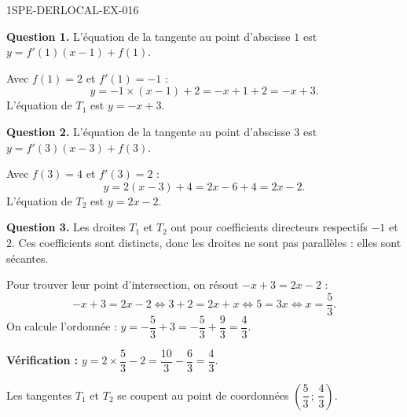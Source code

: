 \begin{corrige}{1SPE-DERLOCAL-EX-016}

\textbf{Question 1.} L'équation de la tangente au point d'abscisse $1$ est $y = f'(1)(x - 1) + f(1)$.

Avec $f(1) = 2$ et $f'(1) = -1$ :
\[
y = -1 \times (x - 1) + 2 = -x + 1 + 2 = -x + 3.
\]
L'équation de $T_1$ est $\boxed{y = -x + 3}$.

\textbf{Question 2.} L'équation de la tangente au point d'abscisse $3$ est $y = f'(3)(x - 3) + f(3)$.

Avec $f(3) = 4$ et $f'(3) = 2$ :
\[
y = 2(x - 3) + 4 = 2x - 6 + 4 = 2x - 2.
\]
L'équation de $T_2$ est $\boxed{y = 2x - 2}$.

\textbf{Question 3.} Les droites $T_1$ et $T_2$ ont pour coefficients directeurs respectifs $-1$ et $2$. Ces coefficients sont distincts, donc les droites ne sont pas parallèles : elles sont sécantes.

Pour trouver leur point d'intersection, on résout $-x + 3 = 2x - 2$ :
\[
-x + 3 = 2x - 2 \iff 3 + 2 = 2x + x \iff 5 = 3x \iff x = \dfrac{5}{3}.
\]
On calcule l'ordonnée : $y = -\dfrac{5}{3} + 3 = -\dfrac{5}{3} + \dfrac{9}{3} = \dfrac{4}{3}$.

\textbf{Vérification :} $y = 2 \times \dfrac{5}{3} - 2 = \dfrac{10}{3} - \dfrac{6}{3} = \dfrac{4}{3}$. \checkmark

Les tangentes $T_1$ et $T_2$ se coupent au point de coordonnées $\boxed{\left(\dfrac{5}{3}\,;\,\dfrac{4}{3}\right)}$.

\end{corrige}
